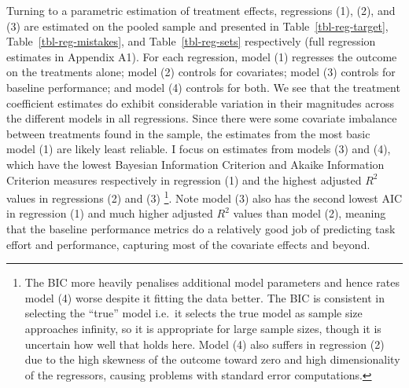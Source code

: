 \documentclass[
  12,
  letterpaper,
  DIV=11,
  numbers=noendperiod]{scrartcl}
\begin{document}
Turning to a parametric estimation of treatment effects, regressions
(1), (2), and (3) are estimated on the pooled sample and presented in
Table~\ref{tbl-reg-target}, Table~\ref{tbl-reg-mistakes}, and
Table~\ref{tbl-reg-sets} respectively (full regression estimates in
Appendix A1). For each regression, model (1) regresses the outcome on
the treatments alone; model (2) controls for covariates; model (3)
controls for baseline performance; and model (4) controls for both. We
see that the treatment coefficient estimates do exhibit considerable
variation in their magnitudes across the different models in all
regressions. Since there were some covariate imbalance between
treatments found in the sample, the estimates from the most basic model
(1) are likely least reliable. I focus on estimates from models (3) and
(4), which have the lowest Bayesian Information Criterion and Akaike
Information Criterion measures respectively in regression (1) and the
highest adjusted \(R^2\) values in regressions (2) and (3) \footnote{The
  BIC more heavily penalises additional model parameters and hence rates
  model (4) worse despite it fitting the data better. The BIC is
  consistent in selecting the ``true'' model i.e.~it selects the true
  model as sample size approaches infinity, so it is appropriate for
  large sample sizes, though it is uncertain how well that holds here.
  Model (4) also suffers in regression (2) due to the high skewness of
  the outcome toward zero and high dimensionality of the regressors,
  causing problems with standard error computations.}. Note model (3)
also has the second lowest AIC in regression (1) and much higher
adjusted \(R^2\) values than model (2), meaning that the baseline
performance metrics do a relatively good job of predicting task effort
and performance, capturing most of the covariate effects and beyond.
\end{document}
